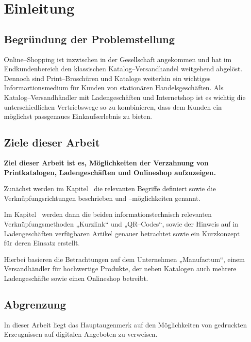 \section{Einleitung}
\label{sec:einleitung}

\subsection{Begründung der Problemstellung}

Online--Shopping ist inzwischen in der Gesellschaft angekommen und hat im Endkundenbereich den klassischen Katalog--Versandhandel weitgehend abgelöst. Dennoch sind Print--Broschüren und Kataloge weiterhin ein wichtiges Informartionsmedium für Kunden von stationären Handelsgeschäften. Als Katalog--Versandhändler mit Ladengeschäften und Internetshop ist es wichtig die unterschiedlichen Vertriebswege so zu kombinieren, dass dem Kunden ein möglichst passgenaues Einkaufserlebnis zu bieten.

\subsection{Ziele dieser Arbeit}

\textbf{Ziel dieser Arbeit ist es, Möglichkeiten der Verzahnung von Printkatalogen, Ladengeschäften und Onlineshop aufzuzeigen.}

Zunächst werden im Kapitel~ die relevanten Begriffe definiert sowie die Verknüpfungsrichtungen beschrieben und --möglichkeiten genannt.

Im Kapitel~ werden dann die beiden informationstechnisch relevanten Verknüpfungsmethoden „Kurzlink“ und „QR--Codes“, sowie der Hinweis auf in Ladengeschäften verfügbaren Artikel genauer betrachtet sowie ein Kurzkonzept für deren Einsatz erstellt.

Hierbei basieren die Betrachtungen auf dem Unternehmen „Manufactum“, einem Versandhändler für hochwertige Produkte, der neben Katalogen auch mehrere Ladengeschäfte sowie einen Onlineshop betreibt.

\subsection{Abgrenzung}

In dieser Arbeit liegt das Hauptaugenmerk auf den Möglichkeiten von gedruckten Erzeugnissen auf digitalen Angeboten zu verweisen.

